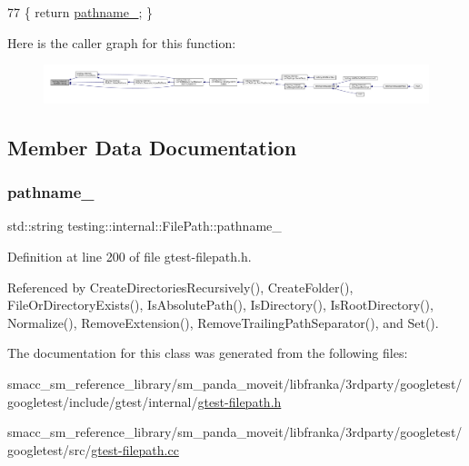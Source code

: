 \begin{DoxyCode}
77 \{ \textcolor{keywordflow}{return} \hyperlink{classtesting_1_1internal_1_1FilePath_a12ce28a0015f85604e0372230fa18d6e}{pathname\_}; \}
\end{DoxyCode}
Here is the caller graph for this function\+:
\nopagebreak
\begin{figure}[H]
\begin{center}
\leavevmode
\includegraphics[width=350pt]{classtesting_1_1internal_1_1FilePath_ab1d58734f2e179264eb6353fea57361d_icgraph}
\end{center}
\end{figure}


\subsection{Member Data Documentation}
\mbox{\label{classtesting_1_1internal_1_1FilePath_a12ce28a0015f85604e0372230fa18d6e}} 
\subsubsection{\texorpdfstring{pathname\+\_\+}{pathname\_}}
{\footnotesize\ttfamily std\+::string testing\+::internal\+::\+File\+Path\+::pathname\+\_\+\hspace{0.3cm}{\ttfamily [private]}}



Definition at line 200 of file gtest-\/filepath.\+h.



Referenced by Create\+Directories\+Recursively(), Create\+Folder(), File\+Or\+Directory\+Exists(), Is\+Absolute\+Path(), Is\+Directory(), Is\+Root\+Directory(), Normalize(), Remove\+Extension(), Remove\+Trailing\+Path\+Separator(), and Set().



The documentation for this class was generated from the following files\+:\begin{DoxyCompactItemize}
\item 
smacc\+\_\+sm\+\_\+reference\+\_\+library/sm\+\_\+panda\+\_\+moveit/libfranka/3rdparty/googletest/googletest/include/gtest/internal/\hyperlink{gtest-filepath_8h}{gtest-\/filepath.\+h}\item 
smacc\+\_\+sm\+\_\+reference\+\_\+library/sm\+\_\+panda\+\_\+moveit/libfranka/3rdparty/googletest/googletest/src/\hyperlink{gtest-filepath_8cc}{gtest-\/filepath.\+cc}\end{DoxyCompactItemize}
